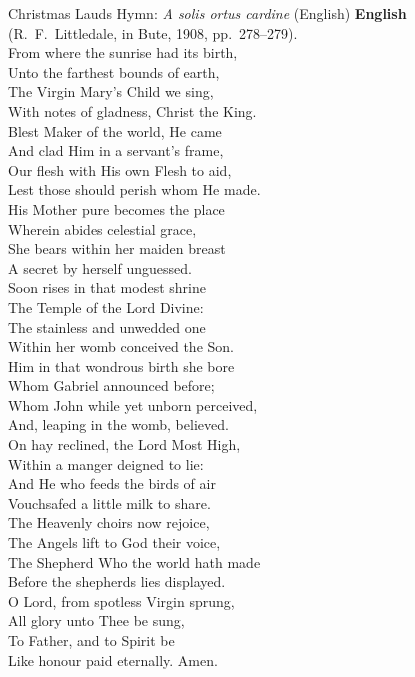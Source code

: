 \begin{massbox}{Christmas Lauds Hymn: \textit{A solis ortus cardine} (English)}
\textbf{English} (R.~F.~Littledale, in Bute, 1908, pp.~278--279).\\
From where the sunrise had its birth,\\
Unto the farthest bounds of earth,\\
The Virgin Mary's Child we sing,\\
With notes of gladness, Christ the King.\\[0.4em]
Blest Maker of the world, He came\\
And clad Him in a servant's frame,\\
Our flesh with His own Flesh to aid,\\
Lest those should perish whom He made.\\[0.4em]
His Mother pure becomes the place\\
Wherein abides celestial grace,\\
She bears within her maiden breast\\
A secret by herself unguessed.\\[0.4em]
Soon rises in that modest shrine\\
The Temple of the Lord Divine:\\
The stainless and unwedded one\\
Within her womb conceived the Son.\\[0.4em]
Him in that wondrous birth she bore\\
Whom Gabriel announced before;\\
Whom John while yet unborn perceived,\\
And, leaping in the womb, believed.\\[0.4em]
On hay reclined, the Lord Most High,\\
Within a manger deigned to lie:\\
And He who feeds the birds of air\\
Vouchsafed a little milk to share.\\[0.4em]
The Heavenly choirs now rejoice,\\
The Angels lift to God their voice,\\
The Shepherd Who the world hath made\\
Before the shepherds lies displayed.\\[0.4em]
O Lord, from spotless Virgin sprung,\\
All glory unto Thee be sung,\\
To Father, and to Spirit be\\
Like honour paid eternally. Amen.
\end{massbox}

